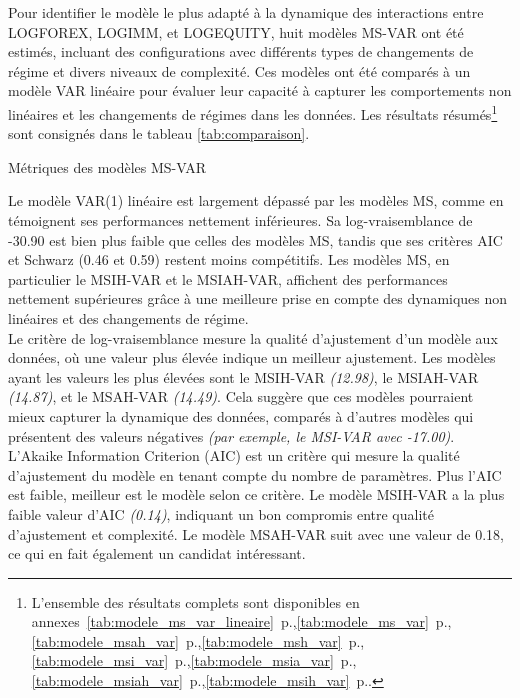 Pour identifier le modèle le plus adapté à la dynamique des interactions entre LOGFOREX, LOGIMM, et LOGEQUITY, huit modèles MS-VAR ont été estimés, incluant des configurations avec différents types de changements de régime et divers niveaux de complexité. Ces modèles ont été comparés à un modèle VAR linéaire pour évaluer leur capacité à capturer les comportements non linéaires et les changements de régimes dans les données. Les résultats résumés\footnote{L'ensemble des résultats complets sont disponibles en annexes~\autoref{tab:modele_ms_var_lineaire}~p.\pageref{tab:modele_ms_var_lineaire},\autoref{tab:modele_ms_var}~p.\pageref{tab:modele_ms_var}, \autoref{tab:modele_msah_var}~p.\pageref{tab:modele_msah_var},\autoref{tab:modele_msh_var}~p.\pageref{tab:modele_msh_var},\autoref{tab:modele_msi_var}~p.\pageref{tab:modele_msi_var},\autoref{tab:modele_msia_var}~p.\pageref{tab:modele_msia_var},\autoref{tab:modele_msiah_var}~p.\pageref{tab:modele_msiah_var},\autoref{tab:modele_msih_var}~p.\pageref{tab:modele_msih_var}.} sont consignés dans le tableau \autoref{tab:comparaison}. 

\begin{table}[H]
    \centering
    \caption{Métriques des modèles MS-VAR}
    \sffamily
    
    \label{tab:comparaison}
\end{table}

Le modèle VAR(1) linéaire est largement dépassé par les modèles MS, comme en témoignent ses performances nettement inférieures. Sa log-vraisemblance de -30.90 est bien plus faible que celles des modèles MS, tandis que ses critères AIC et Schwarz (0.46 et 0.59) restent moins compétitifs. Les modèles MS, en particulier le MSIH-VAR et le MSIAH-VAR, affichent des performances nettement supérieures grâce à une meilleure prise en compte des dynamiques non linéaires et des changements de régime.\\

Le critère de log-vraisemblance mesure la qualité d'ajustement d'un modèle aux données, où une valeur plus élevée indique un meilleur ajustement. Les modèles ayant les valeurs les plus élevées sont le MSIH-VAR \textit{(12.98)}, le MSIAH-VAR \textit{(14.87)}, et le MSAH-VAR \textit{(14.49)}. Cela suggère que ces modèles pourraient mieux capturer la dynamique des données, comparés à d'autres modèles qui présentent des valeurs négatives \textit{(par exemple, le MSI-VAR avec -17.00)}.\\

L'Akaike Information Criterion (AIC) est un critère qui mesure la qualité d'ajustement du modèle en tenant compte du nombre de paramètres. Plus l'AIC est faible, meilleur est le modèle selon ce critère. Le modèle MSIH-VAR a la plus faible valeur d'AIC \textit{(0.14)}, indiquant un bon compromis entre qualité d'ajustement et complexité. Le modèle MSAH-VAR suit avec une valeur de 0.18, ce qui en fait également un candidat intéressant.\\

